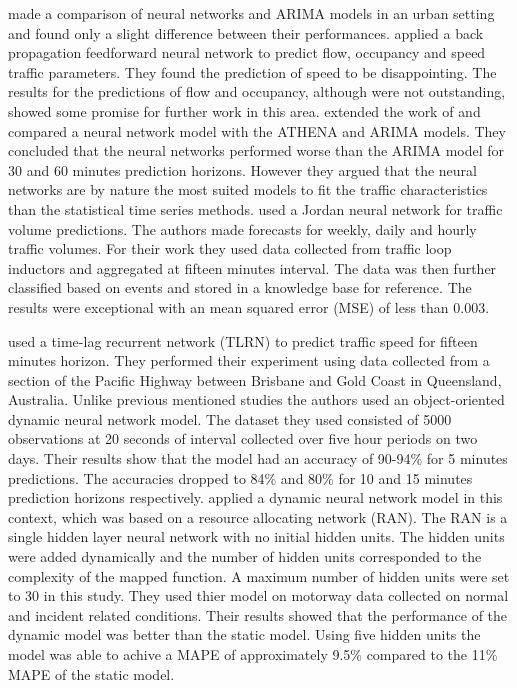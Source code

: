\citet{clark1993use} made a comparison of neural networks and ARIMA models in an urban setting
and found only a slight difference between their performances. \citet{dougherty1997short} applied a
back propagation feedforward neural network to predict flow, occupancy and speed traffic parameters.
They found the prediction of speed to be disappointing. The results for the predictions of flow and occupancy,
although were not outstanding, showed some promise for further work in this area.
\citet{kirby1997should} extended the work of \citet{clark1993use} and compared a neural network model
with the ATHENA and ARIMA models. They concluded that the neural networks performed worse than the
ARIMA model for 30 and 60 minutes prediction horizons. However they argued that the neural networks
are by nature the most suited models to fit the traffic characteristics than the statistical time
series methods. \citet{yasdi1999prediction} used a Jordan neural network for traffic volume predictions.
The authors made forecasts for weekly, daily and hourly traffic volumes. For their work they used
data collected from traffic loop inductors and aggregated at fifteen minutes interval. The data was
then further classified based on events and stored in a knowledge base for reference. The results were
exceptional with an mean squared error (MSE) of less than 0.003.

\citet{dia2001object} used a time-lag recurrent network (TLRN) to predict traffic speed for fifteen
minutes horizon. They performed their experiment using data collected from a section of the Pacific Highway between
Brisbane and Gold Coast in Queensland, Australia. Unlike previous mentioned studies the authors used
an object-oriented dynamic neural network model. The dataset they used consisted of 5000
observations at 20 seconds of interval collected over five hour periods on two days. Their results
show that the model had an accuracy of 90-94\% for 5 minutes predictions. The accuracies dropped
to 84\% and 80\% for 10 and 15 minutes prediction horizons respectively. \citet{chen2001use} applied
a dynamic neural network model in this context, which was based on a resource allocating network (RAN).
The RAN is a single hidden layer neural network with no initial hidden units. The hidden units were added
dynamically and the number of hidden units corresponded to the complexity of the mapped function.
A maximum number of hidden units were set to 30 in this study. They used thier model on motorway
data collected on normal and incident related conditions. Their results showed that the performance of
 the dynamic model was better than the static model. Using five hidden units the model was able to
 achive a MAPE of approximately 9.5\% compared to the 11\% MAPE of the static model.

